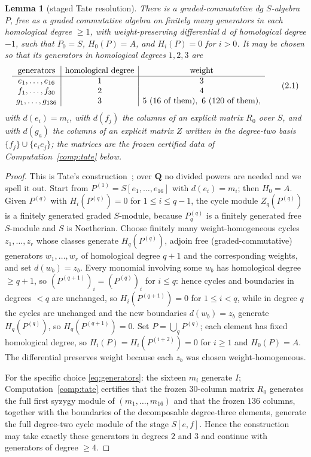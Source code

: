\documentclass[11pt]{article}
\newtheorem{lemma}[theorem]{Lemma}
\theoremstyle{definition}
\theoremstyle{remark}
\newcommand{\QQ}{\mathbf Q}
\begin{document}
\begin{lemma}[staged Tate resolution]\label{lem:tateexists}
There is a graded-commutative dg $S$-algebra $P$, free as a graded
commutative algebra on finitely many generators in each homological degree
$\geq1$, with weight-preserving differential $d$ of homological degree $-1$,
such that $P_0=S$, $H_0(P)=A$, and $H_i(P)=0$ for $i>0$.  It may be chosen
so that its generators in homological degrees $1,2,3$ are
\[
\begin{array}{c|c|c}
\textup{generators}&\textup{homological degree}&\textup{weight}\\ \hline
e_1,\ldots,e_{16}&1&3\\
f_1,\ldots,f_{30}&2&4\\
g_1,\ldots,g_{136}&3&5\ (16\textup{ of them}),\
6\ (120\textup{ of them}),
\end{array}
\tag{2.1}\label{eq:generators}
\]
with $d(e_i)=m_i$, with $d(f_j)$ the columns of an explicit matrix
$R_0$ over $S$, and with $d(g_a)$ the columns of an explicit matrix $Z$
written in the degree-two basis $\{f_j\}\cup\{e_ie_j\}$; the matrices are
the frozen certified data of Computation~\textup{\ref{comp:tate}} below.
\end{lemma}

\begin{proof}
This is Tate's construction~\cite{Tate,Avramov}; over $\QQ$ no divided
powers are needed and we spell it out.  Start from
$P^{(1)}=S[e_1,\ldots,e_{16}]$ with $d(e_i)=m_i$; then $H_0=A$.  Given
$P^{(q)}$ with $H_i(P^{(q)})=0$ for $1\leq i\leq q-1$, the cycle module
$Z_q(P^{(q)})$ is a finitely generated graded $S$-module, because
$P^{(q)}_q$ is a finitely generated free $S$-module and $S$ is Noetherian.
Choose finitely many weight-homogeneous cycles $z_1,\ldots,z_r$ whose
classes generate $H_q(P^{(q)})$, adjoin free (graded-commutative) generators
$w_1,\ldots,w_r$ of homological degree $q+1$ and the corresponding weights,
and set $d(w_b)=z_b$.  Every monomial involving some $w_b$ has homological
degree $\geq q+1$, so $(P^{(q+1)})_i=(P^{(q)})_i$ for $i\leq q$: hence
cycles and boundaries in degrees $<q$ are unchanged, so $H_i(P^{(q+1)})=0$
for $1\le i<q$, while in degree $q$ the cycles are unchanged and the new
boundaries $d(w_b)=z_b$ generate $H_q(P^{(q)})$, so $H_q(P^{(q+1)})=0$.  Set
$P=\bigcup_qP^{(q)}$; each element has fixed homological degree, so
$H_i(P)=H_i(P^{(i+2)})=0$ for $i\geq1$ and $H_0(P)=A$.  The differential
preserves weight because each $z_b$ was chosen weight-homogeneous.

For the specific choice \eqref{eq:generators}: the sixteen $m_i$ generate
$I$; Computation~\ref{comp:tate} certifies that the frozen $30$-column
matrix $R_0$ generates the full first syzygy module of $(m_1,\ldots,m_{16})$
and that the frozen $136$ columns, together with the boundaries of the
decomposable degree-three elements, generate the full degree-two cycle
module of the stage $S[e,f]$.  Hence the construction may take exactly these
generators in degrees $2$ and $3$ and continue with generators of degree
$\geq4$.
\end{proof}
\end{document}
